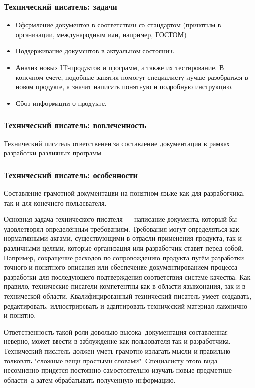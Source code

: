 \documentclass{../industrial-development}
\begin{document}
	\begin{frame} \frametitle{Технический писатель: задачи}
		\begin{itemize}
			\item Оформление документов в соответствии со стандартом (принятым в организации, международным или, например, ГОСТОМ)
			\item Поддерживание документов в актуальном состоянии.
			\item Анализ новых IT-продуктов и программ, а также их тестирование. В конечном счете, подобные занятия помогут специалисту лучше разобраться в новом продукте, а значит написать понятную и подробную инструкцию.
			\item Сбор информации о продукте.
		\end{itemize}
	\end{frame}
	\begin{frame} \frametitle{Технический писатель: вовлеченность}
		Технический писатель ответственен за составление документации в рамках разработки различных программ.
	\end{frame}
	
	\begin{frame} \frametitle{Технический писатель: особенности}
		Составление грамотной документации на понятном языке как для разработчика, так и для конечного пользователя.
	\end{frame}
	
	\lecturenotes
		Основная задача технического писателя — написание документа, который бы удовлетворял определённым требованиям. Требования могут определяться как нормативными актами, существующими в отрасли применения продукта, так и различными целями, которые организация или разработчик ставит перед собой. Например, сокращение расходов по сопровождению продукта путём разработки точного и понятного описания или обеспечение документированием процесса разработки для последующего подтверждения соответствия системе качества. Как правило, технические писатели компетентны как в области языкознания, так и в технической области. Квалифицированный технический писатель умеет создавать, редактировать, иллюстрировать и адаптировать технический материал лаконично и понятно. 
		
		Ответственность такой роли довольно высока, документация составленная неверно, может ввести в заблуждение как пользователя так и разработчика. Технический писатель должен уметь грамотно излагать мысли и правильно толковать "сложные вещи простыми словами". Специалисту этого вида несомненно придется постоянно самостоятельно изучать новые предметные области, а затем обрабатывать полученную информацию.
		
\end{document}

